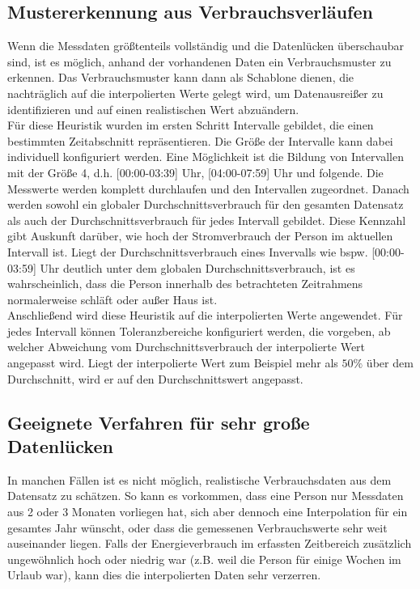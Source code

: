 \subsection{Mustererkennung aus Verbrauchsverläufen}
Wenn die Messdaten größtenteils vollständig und die Datenlücken überschaubar sind, ist es möglich, anhand der vorhandenen Daten ein Verbrauchsmuster zu erkennen. Das Verbrauchsmuster kann dann als Schablone dienen, die nachträglich auf die interpolierten Werte gelegt wird, um Datenausreißer zu identifizieren und auf einen realistischen Wert abzuändern.\\
Für diese Heuristik wurden im ersten Schritt Intervalle gebildet, die einen bestimmten Zeitabschnitt repräsentieren. Die Größe der Intervalle kann dabei individuell konfiguriert werden. Eine Möglichkeit ist die Bildung von Intervallen mit der Größe 4, d.h. [00:00-03:39] Uhr, [04:00-07:59] Uhr und folgende. Die Messwerte werden komplett durchlaufen und den Intervallen zugeordnet. Danach werden sowohl ein globaler Durchschnittsverbrauch für den gesamten Datensatz als auch der Durchschnittsverbrauch für jedes Intervall gebildet. Diese Kennzahl gibt Auskunft darüber, wie hoch der Stromverbrauch der Person im aktuellen Intervall ist. Liegt der Durchschnittsverbrauch eines Invervalls wie bspw. [00:00-03:59] Uhr deutlich unter dem globalen Durchschnittsverbrauch, ist es wahrscheinlich, dass die Person innerhalb des betrachteten Zeitrahmens normalerweise schläft oder außer Haus ist.\\
Anschließend wird diese Heuristik auf die interpolierten Werte angewendet. Für jedes Intervall können Toleranzbereiche konfiguriert werden, die vorgeben, ab welcher Abweichung vom Durchschnittsverbrauch der interpolierte Wert angepasst wird. Liegt der interpolierte Wert zum Beispiel mehr als $50\%$ über dem Durchschnitt, wird er auf den Durchschnittswert angepasst.


\subsection{Geeignete Verfahren für sehr große Datenlücken}
In manchen Fällen ist es nicht möglich, realistische Verbrauchsdaten aus dem Datensatz zu schätzen. So kann es vorkommen, dass eine Person nur Messdaten aus 2 oder 3 Monaten vorliegen hat, sich aber dennoch eine Interpolation für ein gesamtes Jahr wünscht, oder dass die gemessenen Verbrauchswerte sehr weit auseinander liegen. Falls der Energieverbrauch im erfassten Zeitbereich zusätzlich ungewöhnlich hoch oder niedrig war (z.B. weil die Person für einige Wochen im Urlaub war), kann dies die interpolierten Daten sehr verzerren.

